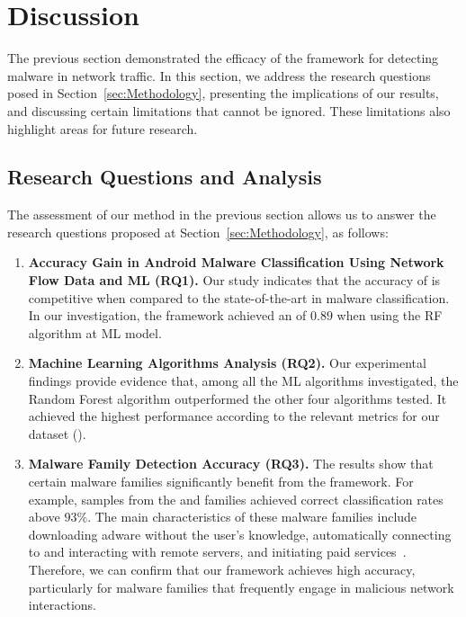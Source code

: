 \section{Discussion}\label{sec:discussion}

The previous section demonstrated the efficacy of the \droidxpflow framework for detecting malware in network traffic. In this section, we address the research questions posed in Section~\ref{sec:Methodology}, presenting the implications of our results, and discussing certain limitations that cannot be ignored. These limitations also highlight areas for future research.

\subsection{Research Questions and Analysis}\label{sec:questions}

The assessment of our method in the previous section allows us to answer the research questions proposed at Section~\ref{sec:Methodology}, as follows:\newline



\begin{enumerate}
    \item \textbf{Accuracy Gain in Android Malware Classification Using Network Flow Data and ML (RQ1).} Our study indicates that the accuracy of \droidxpflow is competitive when compared to the state-of-the-art in malware classification. In our investigation, the framework achieved an \fone of $0.89$ when using the RF algorithm at ML model.
    
    \item \textbf{Machine Learning Algorithms Analysis (RQ2).} Our experimental findings provide evidence that, among all the ML algorithms investigated, the Random Forest algorithm outperformed the other four algorithms tested. It achieved the highest performance according to the relevant metrics for our dataset (\fds).
    
    \item \textbf{Malware Family Detection Accuracy (RQ3).} The results show that certain malware families significantly benefit from the \droidxpflow framework. For example, samples from the \tjk and \gps families achieved correct classification rates above $93\%$. The main characteristics of these malware families include downloading adware without the user’s knowledge, automatically connecting to and interacting with remote servers, and initiating paid services~\cite{DBLP:journals/jnca/WangCYYPJ19}. Therefore, we can confirm that our framework achieves high accuracy, particularly for malware families that frequently engage in malicious network interactions.
\end{enumerate}

